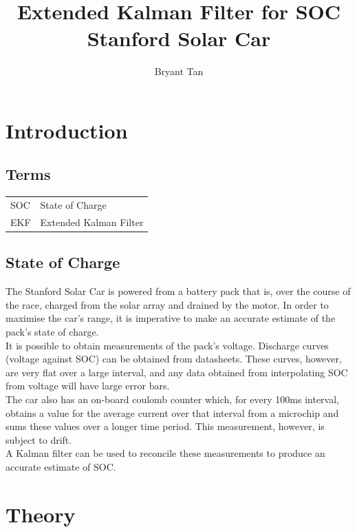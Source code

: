 \documentclass[letterpaper,12pt]{article} %
\title{Extended Kalman Filter for SOC\\Stanford Solar Car}
\author{Bryant Tan}
\begin{document}
\maketitle

\tableofcontents

\newpage

\section{Introduction}

\subsection{Terms}

\begin{tabular}{ l l }
SOC & State of Charge \\
EKF & Extended Kalman Filter
\end{tabular}

\subsection{State of Charge}

The Stanford Solar Car is powered from a battery pack that is, over the course of the race, charged from the solar array and drained by the motor. In order to maximise the car's range, it is imperative to make an accurate estimate of the pack's state of charge.\\

It is possible to obtain measurements of the pack's voltage. Discharge curves (voltage against SOC) can be obtained from datasheets. These curves, however, are very flat over a large interval, and any data obtained from interpolating SOC from voltage will have large error bars.\\

The car also has an on-board coulomb counter which, for every 100ms interval, obtains a value for the average current over that interval from a microchip and sums these values over a longer time period. This measurement, however, is subject to drift.\\

A Kalman filter can be used to reconcile these measurements to produce an accurate estimate of SOC.

\newpage

\section{Theory}
\end{document}
